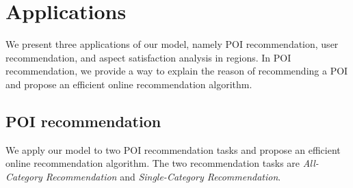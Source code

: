 \section{Applications}
\label{sec:app}
We present three applications of our model, namely POI recommendation,
user recommendation, and aspect satisfaction analysis in regions. In POI recommendation,
we provide a way to explain the reason of recommending a POI and
propose an efficient online recommendation algorithm.

\subsection{POI recommendation}
\label{sec:model-poirec}

We apply our model to two POI recommendation tasks
and propose an efficient online recommendation algorithm.
The two recommendation tasks are \emph{All-Category Recommendation}
and \emph{Single-Category Recommendation}.


